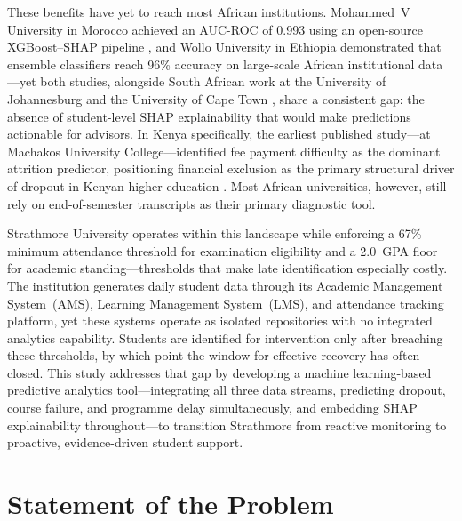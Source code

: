 \documentclass[12pt]{report}
\begin{document}
These benefits have yet to reach most African institutions. Mohammed~V University
in Morocco achieved an AUC-ROC of 0.993 using an open-source XGBoost--SHAP
pipeline \parencite{bettahi2025}, and Wollo University in Ethiopia demonstrated that
ensemble classifiers reach 96\% accuracy on large-scale African institutional
data \parencite{esmael2024}---yet both studies, alongside South African work at the
University of Johannesburg \parencite{taodzera2016} and the University of Cape Town
\parencite{hassen2020}, share a consistent gap: the absence of student-level SHAP
explainability that would make predictions actionable for advisors. In Kenya
specifically, the earliest published study---at Machakos University
College---identified fee payment difficulty as the dominant attrition predictor,
positioning financial exclusion as the primary structural driver of dropout in
Kenyan higher education \parencite{ngemu2015}. Most African universities, however,
still rely on end-of-semester transcripts as their primary diagnostic tool.

Strathmore University operates within this landscape while enforcing a 67\%
minimum attendance threshold for examination eligibility and a 2.0~GPA floor for
academic standing---thresholds that make late identification especially costly.
The institution generates daily student data through its Academic Management
System~(AMS), Learning Management System~(LMS), and attendance tracking
platform, yet these systems operate as isolated repositories with no integrated
analytics capability. Students are identified for intervention only after
breaching these thresholds, by which point the window for effective recovery has
often closed. This study addresses that gap by developing a machine
learning-based predictive analytics tool---integrating all three data
streams, predicting dropout, course failure, and programme delay simultaneously,
and embedding SHAP explainability throughout---to transition Strathmore from
reactive monitoring to proactive, evidence-driven student support.

\section{Statement of the Problem}
\end{document}
